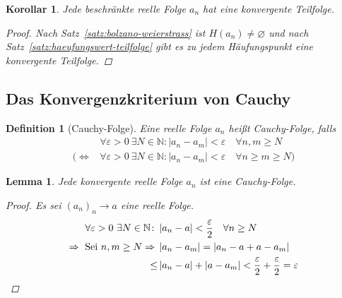 \documentclass[11pt, twoside, a4paper]{article}
\theoremstyle{plain}
\newtheorem{definition}[blockelement]{Definition}
\newtheorem{lemma}[blockelement]{Lemma}
\newtheorem{korollar}[blockelement]{Korollar}
\newcommand{\abs}[1]{\left|#1\right|}
\newcommand{\equivalent}[0]{\Leftrightarrow{}}
\newcommand{\impl}[0]{\Rightarrow{}}
\renewcommand{\emptyset}{\varnothing}
\newcommand{\fromto}{\rightarrow{}}
\newcommand{\naturalnumbers}{\mathbb{N}}
\begin{document}
    \begin{korollar}
        Jede beschränkte reelle Folge $a_n$ hat eine konvergente Teilfolge.
        \begin{proof}
            Nach Satz~\ref{satz:bolzano-weierstrass} ist $H(a_n) \neq\emptyset$ und nach Satz~\ref{satz:haeufungswert-teilfolge} gibt es zu jedem Häufungspunkt eine konvergente Teilfolge.
        \end{proof}
    \end{korollar}

    \newpage

    \subsection{Das Konvergenzkriterium von Cauchy}

    \begin{definition}[Cauchy-Folge]
        Eine reelle Folge $a_n$ heißt Cauchy-Folge, falls
        \begin{align*}
            &\forall\varepsilon > 0~\exists N\in\naturalnumbers\colon \abs{a_n - a_m} < \varepsilon\quad\forall n,m \geq N\\
            (\equivalent &\forall \varepsilon > 0~\exists N\in\naturalnumbers\colon \abs{a_n - a_m} < \varepsilon\quad\forall n\geq m\geq N)
        \end{align*}
    \end{definition}

    \begin{lemma} %
        \label{lemma:konv-cauchy}
        Jede konvergente reelle Folge $a_n$ ist eine Cauchy-Folge.
        \begin{proof}
            Es sei $(a_n)_n\fromto a$ eine reelle Folge.
            \begin{align*}
                \forall \varepsilon > 0~\exists N\in\naturalnumbers\colon &\abs{a_n-a} < \frac{\varepsilon}{2}\quad\forall n\geq N\\
                \impl\text{ Sei }n,m\geq N \impl &\abs{a_n-a_m} = \abs{a_n-a+a-a_m}\\
                \leq &\abs{a_n-a} + \abs{a-a_m} < \frac{\varepsilon}{2} + \frac{\varepsilon}{2} = \varepsilon\qedhere
            \end{align*}
        \end{proof}
    \end{lemma}
\end{document}
